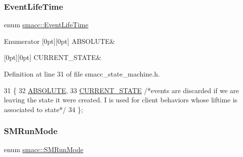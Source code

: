 \subsubsection{\texorpdfstring{Event\+Life\+Time}{EventLifeTime}}
{\footnotesize\ttfamily enum \hyperlink{namespacesmacc_a5063f47926ad2fe25120ed4b1e7b2c7e}{smacc\+::\+Event\+Life\+Time}\hspace{0.3cm}{\ttfamily [strong]}}

\begin{DoxyEnumFields}{Enumerator}
[0pt][0pt]{}\mbox{\label{namespacesmacc_a5063f47926ad2fe25120ed4b1e7b2c7ea3a0bc063b6db8cae0361657958be836f}} 
A\+B\+S\+O\+L\+U\+TE&\\
\hline

[0pt][0pt]{}\mbox{\label{namespacesmacc_a5063f47926ad2fe25120ed4b1e7b2c7ea49b599d413671f16f08d0dd18243c294}} 
C\+U\+R\+R\+E\+N\+T\+\_\+\+S\+T\+A\+TE&\\
\hline

\end{DoxyEnumFields}


Definition at line 31 of file smacc\+\_\+state\+\_\+machine.\+h.


\begin{DoxyCode}
31                         \{
32     \hyperlink{namespacesmacc_a5063f47926ad2fe25120ed4b1e7b2c7ea3a0bc063b6db8cae0361657958be836f}{ABSOLUTE},
33     \hyperlink{namespacesmacc_a5063f47926ad2fe25120ed4b1e7b2c7ea49b599d413671f16f08d0dd18243c294}{CURRENT\_STATE} \textcolor{comment}{/*events are discarded if we are leaving the state it were created. I is
       used for client behaviors whose liftime is associated to state*/}
34 \};
\end{DoxyCode}
\mbox{\label{namespacesmacc_a3e4f79486ea6ea6342dd3c712d16a4f6}} 
\subsubsection{\texorpdfstring{S\+M\+Run\+Mode}{SMRunMode}}
{\footnotesize\ttfamily enum \hyperlink{namespacesmacc_a3e4f79486ea6ea6342dd3c712d16a4f6}{smacc\+::\+S\+M\+Run\+Mode}\hspace{0.3cm}{\ttfamily [strong]}}

